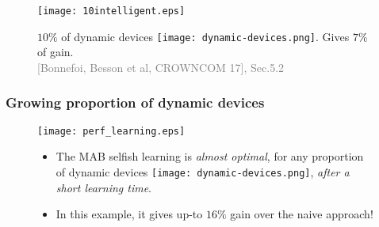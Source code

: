 \begin{frameO}

    \begin{figure}[h!]
        \centering
        \texttt{[image: 10intelligent.eps]}

            $10\%$ of dynamic devices \texttt{[image: dynamic-devices.png]}. Gives $7\%$ of gain.\\
            {\small \textcolor{gray}{[Bonnefoi, Besson et al, CROWNCOM 17], Sec.5.2}}
    \end{figure}

\end{frameO}









\subsubsection{Growing proportion of dynamic devices}

\begin{frameO}

    \begin{figure}[h!]
        \centering
        \texttt{[image: perf\_learning.eps]}

            \begin{itemize}
                \item
                The MAB selfish learning is \emph{almost optimal}, for any proportion of dynamic devices \texttt{[image: dynamic-devices.png]}, \emph{after a short learning time}.

                \item
                In this example, it gives up-to $16\%$ gain over the naive approach!
            \end{itemize}
    \end{figure}

\end{frameO}


